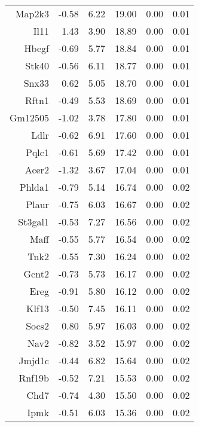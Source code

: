 \begin{table}[ht]
\begin{tabular}{rrrrrr}
  Map2k3 & -0.58 & 6.22 & 19.00 & 0.00 & 0.01 \\ 
  Il11 & 1.43 & 3.90 & 18.89 & 0.00 & 0.01 \\ 
  Hbegf & -0.69 & 5.77 & 18.84 & 0.00 & 0.01 \\ 
  Stk40 & -0.56 & 6.11 & 18.77 & 0.00 & 0.01 \\ 
  Snx33 & 0.62 & 5.05 & 18.70 & 0.00 & 0.01 \\ 
  Rftn1 & -0.49 & 5.53 & 18.69 & 0.00 & 0.01 \\ 
  Gm12505 & -1.02 & 3.78 & 17.80 & 0.00 & 0.01 \\ 
  Ldlr & -0.62 & 6.91 & 17.60 & 0.00 & 0.01 \\ 
  Pqlc1 & -0.61 & 5.69 & 17.42 & 0.00 & 0.01 \\ 
  Acer2 & -1.32 & 3.67 & 17.04 & 0.00 & 0.01 \\ 
  Phlda1 & -0.79 & 5.14 & 16.74 & 0.00 & 0.02 \\ 
  Plaur & -0.75 & 6.03 & 16.67 & 0.00 & 0.02 \\ 
  St3gal1 & -0.53 & 7.27 & 16.56 & 0.00 & 0.02 \\ 
  Maff & -0.55 & 5.77 & 16.54 & 0.00 & 0.02 \\ 
  Tnk2 & -0.55 & 7.30 & 16.24 & 0.00 & 0.02 \\ 
  Gcnt2 & -0.73 & 5.73 & 16.17 & 0.00 & 0.02 \\ 
  Ereg & -0.91 & 5.80 & 16.12 & 0.00 & 0.02 \\ 
  Klf13 & -0.50 & 7.45 & 16.11 & 0.00 & 0.02 \\ 
  Socs2 & 0.80 & 5.97 & 16.03 & 0.00 & 0.02 \\ 
  Nav2 & -0.82 & 3.52 & 15.97 & 0.00 & 0.02 \\ 
  Jmjd1c & -0.44 & 6.82 & 15.64 & 0.00 & 0.02 \\ 
  Rnf19b & -0.52 & 7.21 & 15.53 & 0.00 & 0.02 \\ 
  Chd7 & -0.74 & 4.30 & 15.50 & 0.00 & 0.02 \\ 
  Ipmk & -0.51 & 6.03 & 15.36 & 0.00 & 0.02 \\ 
   \hline
\end{tabular}
\end{table}


